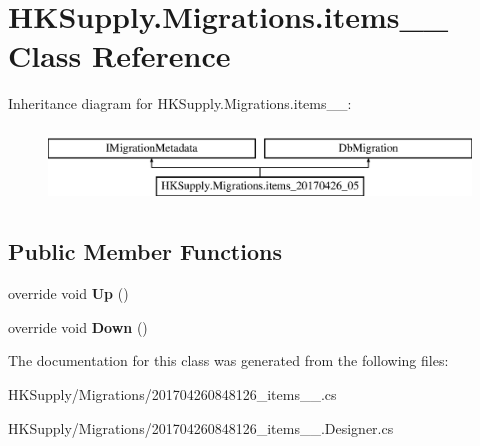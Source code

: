 \hypertarget{class_h_k_supply_1_1_migrations_1_1items__20170426__05}{}\section{H\+K\+Supply.\+Migrations.\+items\+\_\+\_ Class Reference}
\label{class_h_k_supply_1_1_migrations_1_1items__20170426__05}
Inheritance diagram for H\+K\+Supply.\+Migrations.\+items\+\_\+\_\+:\begin{figure}[H]
\begin{center}
\leavevmode
\includegraphics[height=2.000000cm]{class_h_k_supply_1_1_migrations_1_1items__20170426__05}
\end{center}
\end{figure}
\subsection*{Public Member Functions}
\begin{DoxyCompactItemize}
\item 
\mbox{\label{class_h_k_supply_1_1_migrations_1_1items__20170426__05_a890c16edfe103756c0358220d114af5c}} 
override void {\bfseries Up} ()
\item 
\mbox{\label{class_h_k_supply_1_1_migrations_1_1items__20170426__05_adbebb48328e755f4728e6cda742c6632}} 
override void {\bfseries Down} ()
\end{DoxyCompactItemize}


The documentation for this class was generated from the following files\+:\begin{DoxyCompactItemize}
\item 
H\+K\+Supply/\+Migrations/201704260848126\+\_\+items\+\_\+\_.\+cs\item 
H\+K\+Supply/\+Migrations/201704260848126\+\_\+items\+\_\+\_.\+Designer.\+cs\end{DoxyCompactItemize}
